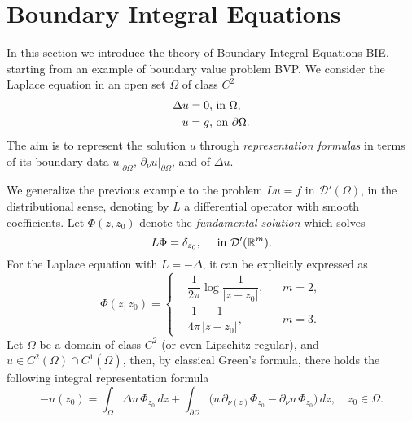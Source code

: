 \documentclass[10pt, a4paper]{article} %
\numberwithin{equation}{section}
\theoremstyle{definition}
\theoremstyle{plain}
\theoremstyle{plain}
\theoremstyle{plain}
\newtheorem{proposition}[subsection]{Proposition}
\theoremstyle{plain}
\theoremstyle{plain}
\theoremstyle{plain}
\theoremstyle{plain}
\theoremstyle{plain}
\newcommand{\upin}{\textup{ in }}
\begin{document}
\section{Boundary Integral Equations}
\label{section:bie}
In this section we introduce the theory of Boundary Integral Equations BIE,
starting from an example of boundary 
value problem BVP. We consider the Laplace equation in an open set $\Omega$ of class $C^2$
\begin{eqnarray}
 \Delta u = 0, & \textup{ in }\Omega,\label{eq:laplace-in}\\
 u = g, & \textup{ on }\partial\Omega.\label{eq:laplace-on}
\end{eqnarray}
The aim is to represent the solution $u$ through \emph{representation formulas} 
in terms of its boundary data $u|_{\partial \Omega}$, $\partial_\nu u|_{\partial \Omega}$, and 
of $\Delta u$.
\par
We generalize the previous example to the problem $Lu = f$ in $\mathcal{D}'(\Omega)$, in the 
distributional sense, denoting by $L$ a differential operator with smooth coefficients.
Let $\Phi(z,z_0)$ denote the \emph{fundamental solution} which solves
\begin{equation}
\label{eq:fundamental-solution}
 L\Phi=\delta_{z_0},\quad\upin\mathcal{D}'(\mathbb{R}^m).
\end{equation}
For the Laplace equation with $L=-\Delta$, it can be explicitly expressed as
\begin{equation}
\label{eq:definition-Phi-23}
  \Phi(z,z_0)=
  \left\{
  \begin{aligned}
   &\dfrac{1}{2\pi}\log\dfrac{1}{| z - z_0|}, && m=2, \\
   &\dfrac{1}{4\pi}\dfrac{1}{| z  - z_0|}, && m=3.
  \end{aligned}
  \right.
\end{equation}
Let $\Omega$ be a domain of class $C^2$ (or even Lipschitz regular),
and $u \in C^2(\Omega)\cap C^1(\overline{\Omega})$,
then, by classical Green's formula,
there holds the following integral representation formula
\begin{equation}
  \label{eq:representation-formula}
  - u(z_0) = \int_\Omega\Delta u\,\Phi_{z_0}\,dz 
  + \int_{\partial \Omega}\big(u\, \partial_{\nu(z)} \Phi_{z_0}
  - \partial_\nu u\,\Phi_{z_0}\big)\,dz, \quad z_0 \in \Omega.
\end{equation}
\end{document}
